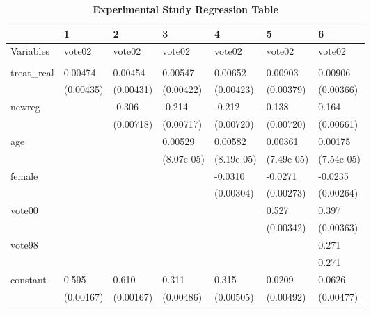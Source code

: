 \documentclass[a4paper]{article}
\begin{document}
\begin{table}[h!]
\caption{\textbf{Experimental Study Regression Table}}
\begin{tabular}{|l|l|l|l|l|l|l|}
\hline
             & 1         & 2         & 3          & 4          & 5          & 6          \\ \hline
Variables    & vote02    & vote02    & vote02     & vote02     & vote02     & vote02     \\ \hline
             &           &           &            &            &            &            \\ \hline
treat\_real  & 0.00474   & 0.00454   & 0.00547    & 0.00652    & 0.00903    & 0.00906    \\ \hline
             & (0.00435) & (0.00431) & (0.00422)  & (0.00423)  & (0.00379)  & (0.00366)  \\ \hline
newreg       &           & -0.306    & -0.214     & -0.212     & 0.138      & 0.164      \\ \hline
             &           & (0.00718) & (0.00717)  & (0.00720)  & (0.00720)  & (0.00661)  \\ \hline
age          &           &           & 0.00529    & 0.00582    & 0.00361    & 0.00175    \\ \hline
             &           &           & (8.07e-05) & (8.19e-05) & (7.49e-05) & (7.54e-05) \\ \hline
female       &           &           &            & -0.0310    & -0.0271    & -0.0235    \\ \hline
             &           &           &            & (0.00304)  & (0.00273)  & (0.00264)  \\ \hline
vote00       &           &           &            &            & 0.527      & 0.397      \\ \hline
             &           &           &            &            & (0.00342)  & (0.00363)  \\ \hline
vote98       &           &           &            &            &            & 0.271      \\ \hline
             &           &           &            &            &            & 0.271      \\ \hline
constant     & 0.595     & 0.610     & 0.311      & 0.315      & 0.0209     & 0.0626     \\ \hline
             & (0.00167) & (0.00167) & (0.00486)  & (0.00505)  & (0.00492)  & (0.00477)  \\ \hline
             &           &           &            &            &            &            \\ \hline

\end{tabular}
\end{table}
\end{document}
